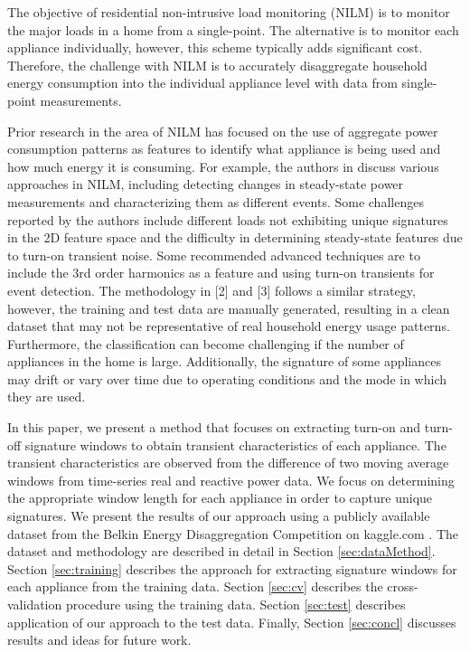\documentclass[conference]{IEEEtran}
\begin{document}
The objective of residential non-intrusive load monitoring (NILM) is to monitor the major loads in a home from a single-point.  The alternative is to monitor each appliance individually, however, this scheme typically adds significant cost. Therefore, the challenge with NILM is to accurately disaggregate household energy consumption into the individual appliance level with data from single-point measurements.  

Prior research in the area of NILM has focused on the use of aggregate power consumption patterns as features to identify what appliance is being used and how much energy it is consuming. For example, the authors in \cite{mit} discuss various approaches in NILM, including detecting changes in steady-state power measurements and characterizing them as different events. Some challenges reported by the authors include different loads not exhibiting unique signatures in the 2D feature space and the difficulty in determining steady-state features due to turn-on transient noise.  Some recommended advanced techniques are to include the 3rd order harmonics as a feature and using turn-on transients for event detection.  The methodology in [2] and [3] follows a similar strategy, however, the training and test data are manually generated, resulting in a clean dataset that may not be representative of real household energy usage patterns.  Furthermore, the classification can become challenging if the number of appliances in the home is large. Additionally, the signature of some appliances may drift or vary over time due to operating conditions and the mode in which they are used. 

In this paper, we present a method that focuses on extracting turn-on and turn-off signature windows to obtain transient characteristics of each appliance.  The transient characteristics are observed from the difference of two moving average windows from time-series real and reactive power data.  We focus on determining the appropriate window length for each appliance in order to capture unique signatures.  We present the results of our approach using a publicly available dataset from the Belkin Energy Disaggregation Competition on kaggle.com \cite{Kaggle}. The dataset and methodology are described in detail in Section \ref{sec:dataMethod}.  Section \ref{sec:training} describes the approach for extracting signature windows for each appliance from the training data. Section \ref{sec:cv} describes the cross-validation procedure using the training data.  Section \ref{sec:test} describes application of our approach to the test data.  Finally, Section \ref{sec:concl} discusses results and ideas for future work.
%
\end{document}
